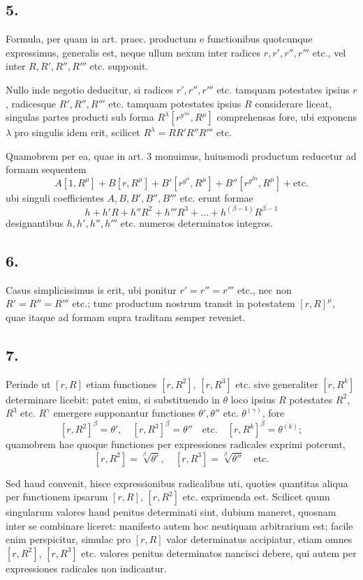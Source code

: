 \documentclass[12pt,a4paper]{article}
\begin{document}
\subsection*{5.}

Formula, per quam in art. praec. productum e functionibus quotcunque expressimus, generalis est, neque ullum nexum inter radices $r, r', r'', r'''$ etc., vel inter $R, R', R'', R'''$ etc. supponit.

Nullo inde negotio deducitur, si radices $r', r'', r'''$ etc. tamquam potestates ipsius $r$, radicesque $R', R'', R'''$ etc. tamquam potestates ipsius $R$ considerare liceat, singulas partes producti sub forma $R^\lambda[r^{g^{\lambda\alpha}}, R^\mu]$ comprehensas fore, ubi exponens $\lambda$ pro singulis idem erit, scilicet $R^\lambda = RR'R''R'''$ etc.

Quamobrem per ea, quae in art. 3 monuimus, huiusmodi productum reducetur ad formam sequentem
\[
A[1, R^\mu] + B[r, R^\mu] + B'[r^{g^\alpha}, R^\mu] + B''[r^{g^{2\alpha}}, R^\mu] + \text{etc.}
\]
ubi singuli coefficientes $A, B, B', B'', B'''$ etc. erunt formae
\[
h + h'R + h''R^2 + h'''R^3 + \ldots + h^{(\beta-1)}R^{\beta-1}
\]
designantibus $h, h', h'', h'''$ etc. numeros determinatos integros.

\subsection*{6.}

Casus simplicissimus is erit, ubi ponitur $r'=r''=r'''$ etc., nec non $R'=R''=R'''$ etc.; tunc productum nostrum transit in potestatem $[r,R]^\mu$, quae itaque ad formam supra traditam semper reveniet.

\subsection*{7.}

Perinde ut $[r,R]$ etiam functiones $[r,R^2]$, $[r,R^3]$ etc. sive generaliter $[r,R^k]$ determinare licebit: patet enim, si substituendo in $\theta$ loco ipsius $R$ potestates $R^2$, $R^3$ etc. $R^\gamma$ emergere supponantur functiones $\theta', \theta''$ etc. $\theta^{(\gamma)}$, fore
\[
[r,R^2]^\beta = \theta', \quad [r,R^3]^\beta = \theta'' \quad\text{etc.}\quad [r,R^k]^\beta = \theta^{(k)};
\]
quamobrem hae quoque functiones per expressiones radicales exprimi poterunt,
\[
[r,R^2] = \sqrt[\beta]{\theta'}, \quad [r,R^3] = \sqrt[\beta]{\theta''} \quad\text{etc.}
\]

Sed haud convenit, hisce expressionibus radicalibus uti, quoties quantitas aliqua per functionem ipsarum $[r,R]$, $[r,R^2]$ etc. exprimenda est. Scilicet quum singularum valores haud penitus determinati sint, dubium maneret, quosnam inter se combinare liceret: manifesto autem hoc neutiquam arbitrarium est; facile enim perspicitur, simulac pro $[r,R]$ valor determinatus accipiatur, etiam omnes $[r,R^2]$, $[r,R^3]$ etc. valores penitus determinatos nancisci debere, qui autem per expressiones radicales non indicantur.
\end{document}
